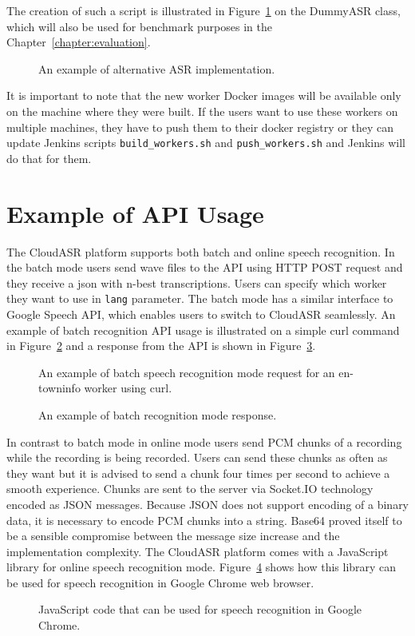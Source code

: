 The creation of such a script is illustrated in Figure~\ref{fig:dummyasr} on the DummyASR class,
  which will also be used for benchmark purposes in the Chapter~\ref{chapter:evaluation}.

\begin{figure}[h]
  

  \caption{An example of alternative ASR implementation.}
  \label{fig:dummyasr}
\end{figure}


It is important to note that the new worker Docker images will be available only on the machine
  where they were built.
If the users want to use these workers on multiple machines, they have to push them to their docker registry
  or they can update Jenkins scripts \texttt{build\_workers.sh} and \texttt{push\_workers.sh}
  and Jenkins will do that for them.


\section{Example of API Usage}
The CloudASR platform supports both batch and online speech recognition.
In the batch mode users send wave files to the API using HTTP POST request
  and they receive a json with n-best transcriptions.
Users can specify which worker they want to use in \texttt{lang} parameter.
The batch mode has a similar interface to Google Speech API,
  which enables users to switch to CloudASR seamlessly.
An example of batch recognition API usage is illustrated on a simple curl command in Figure~\ref{fig:curl}
  and a response from the API is shown in Figure~\ref{fig:curl-response}.

\begin{figure}[h]
  

  \caption{An example of batch speech recognition mode request for an en-towninfo worker using curl.}
  \label{fig:curl}
\end{figure}

\begin{figure}[h]
  

  \caption{An example of batch recognition mode response.}
  \label{fig:curl-response}
\end{figure}

In contrast to batch mode in online mode users send PCM chunks of a recording while the recording is being recorded.
Users can send these chunks as often as they want
  but it is advised to send a chunk four times per second
  to achieve a smooth experience.
Chunks are sent to the server via Socket.IO technology encoded as JSON messages.
Because JSON does not support encoding of a binary data,
  it is necessary to encode PCM chunks into a string.
Base64 proved itself to be a sensible compromise between the message size increase
  and the implementation complexity.
The CloudASR platform comes with a JavaScript library for online speech recognition mode.
Figure~\ref{fig:online} shows how this library can be used for speech recognition in Google Chrome web browser.

\begin{figure}[T]
  

  \caption{JavaScript code that can be used for speech recognition in Google Chrome.}
  \label{fig:online}
  \vspace*{6in}
\end{figure}
